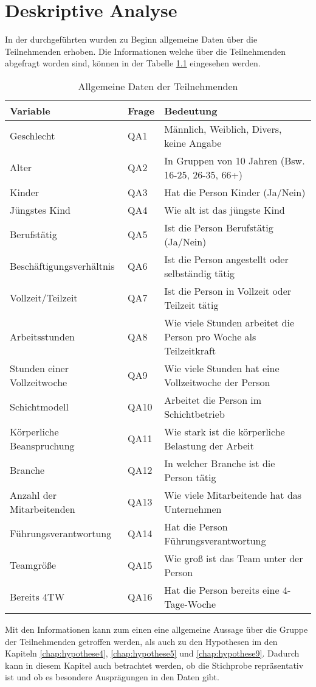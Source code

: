 \chapter{Deskriptive Analyse}

In der durchgeführten wurden zu Beginn allgemeine Daten über die Teilnehmenden erhoben.
Die Informationen welche über die Teilnehmenden abgefragt worden sind, können in der Tabelle
\ref{tab:allgemeine_daten} eingesehen werden.

\begin{table}[h]
    \centering
    \begin{tabular}{|l|l|p{8cm}|}
        \hline
        \textbf{Variable} & \textbf{Frage} & \textbf{Bedeutung}\\
        \hline
        Geschlecht & QA1 & Männlich, Weiblich, Divers, keine Angabe\\
        Alter & QA2 & In Gruppen von 10 Jahren (Bsw. 16-25, 26-35, 66+)\\
        Kinder & QA3 & Hat die Person Kinder (Ja/Nein)\\
        Jüngstes Kind & QA4 & Wie alt ist das jüngste Kind\\
        Berufstätig & QA5 & Ist die Person Berufstätig (Ja/Nein)\\
        Beschäftigungsverhältnis & QA6 & Ist die Person angestellt oder selbständig tätig\\
        Vollzeit/Teilzeit & QA7 & Ist die Person in Vollzeit oder Teilzeit tätig\\
        Arbeitsstunden & QA8 & Wie viele Stunden arbeitet die Person pro Woche als Teilzeitkraft\\
        Stunden einer Vollzeitwoche & QA9 & Wie viele Stunden hat eine Vollzeitwoche der Person\\
        Schichtmodell & QA10 & Arbeitet die Person im Schichtbetrieb\\
        Körperliche Beanspruchung & QA11 & Wie stark ist die körperliche Belastung der Arbeit\\
        Branche & QA12 & In welcher Branche ist die Person tätig\\
        Anzahl der Mitarbeitenden & QA13 & Wie viele Mitarbeitende hat das Unternehmen\\
        Führungsverantwortung & QA14 & Hat die Person Führungsverantwortung\\
        Teamgröße & QA15 & Wie groß ist das Team unter der Person\\
        Bereits 4TW & QA16 & Hat die Person bereits eine 4-Tage-Woche\\
        \hline
    \end{tabular}
    \caption{Allgemeine Daten der Teilnehmenden}
    \label{tab:allgemeine_daten}
\end{table}

Mit den Informationen kann zum einen eine allgemeine Aussage über die Gruppe der Teilnehmenden 
getroffen werden, als auch zu den Hypothesen im den Kapiteln \ref{chap:hypothese4},
\ref{chap:hypothese5} und \ref{chap:hypothese9}. Dadurch kann in diesem Kapitel auch betrachtet
werden, ob die Stichprobe repräsentativ ist und ob es besondere Ausprägungen in den Daten gibt.
 